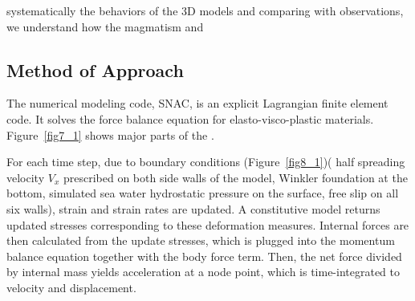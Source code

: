 \documentclass[12pt]{article}
\begin{document}
 systematically  the behaviors of the 3D models and comparing  with observations, we  understand  how the  magmatism and  


\break
\subsection{Method of Approach}
\label{ch:method}

%

The numerical modeling code, SNAC, is an explicit Lagrangian finite element code.  It solves the force balance equation for elasto-visco-plastic materials. Figure~\ref{fig7_1} shows major parts of the . 

For each time step, due to boundary conditions (Figure~\ref{fig8_1})( half spreading velocity $V_{x}$ prescribed on both side walls of the model, Winkler foundation at the bottom, simulated sea water hydrostatic pressure on the surface, free slip on all six walls), strain and strain rates are updated. A constitutive model returns updated stresses corresponding to these deformation measures. Internal forces are then calculated from the update stresses, which is plugged into the momentum balance equation together with the body force term. Then, the net force divided by internal mass yields acceleration at a node point, which is time-integrated to velocity and displacement. 
\end{document}
